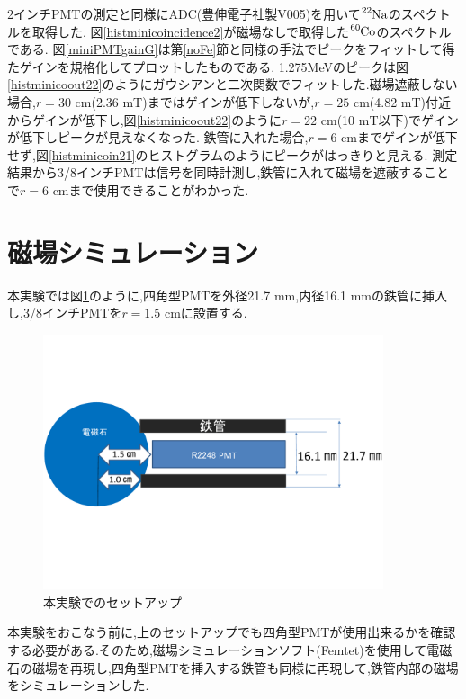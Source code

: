 2インチPMTの測定と同様にADC(豊伸電子社製V005)を用いて$\ce{^{22}Na}$のスペクトルを取得した.
図\ref{histminicoincidence2}が磁場なしで取得した$\ce{^{60}Co}$のスペクトルである.
図\ref{miniPMTgainG}は第\ref{noFe}節と同様の手法でピークをフィットして得たゲインを規格化してプロットしたものである.
1.275MeVのピークは図\ref{histminicoout22}のようにガウシアンと二次関数でフィットした.磁場遮蔽しない場合,$r=30$ cm(2.36 mT)まではゲインが低下しないが,$r=25$ cm(4.82 mT)付近からゲインが低下し,図\ref{histminicoout22}のように$r=22$ cm(10 mT以下)でゲインが低下しピークが見えなくなった.
鉄管に入れた場合,$r=6$ cmまでゲインが低下せず,図\ref{histminicoin21}のヒストグラムのようにピークがはっきりと見える.
測定結果から3/8インチPMTは信号を同時計測し,鉄管に入れて磁場を遮蔽することで$r=6$ cmまで使用できることがわかった.

\section{磁場シミュレーション}
本実験では図\ref{honjikken}のように,四角型PMTを外径21.7 mm,内径16.1 mmの鉄管に挿入し,3/8インチPMTを$r=1.5$ cmに設置する.

\begin{figure}[tbp]
	\centering
		\includegraphics[width=10cm]{fig/iguchi/honjikken.pdf}
	\caption{本実験でのセットアップ}
	\label{honjikken}
\end{figure}

本実験をおこなう前に,上のセットアップでも四角型PMTが使用出来るかを確認する必要がある.そのため,磁場シミュレーションソフト(Femtet)を使用して電磁石の磁場を再現し,四角型PMTを挿入する鉄管も同様に再現して,鉄管内部の磁場をシミュレーションした.

